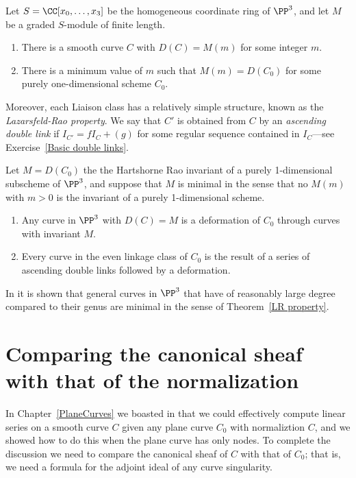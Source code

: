 \begin{fact}
\begin{theorem}
Let $S = \CC[x_0, \dots, x_3]$ be the homogeneous coordinate ring of $\PP^3$, and let $M$ be a graded $S$-module of finite length.
\begin{enumerate}
\item There is a smooth curve $C$ with $D(C) = M(m)$ for some integer $m$.
\item There is a minimum value of $m$ such that $M(m) = D(C_0)$ for some purely one-dimensional scheme $C_0$.
\end{enumerate}
\end{theorem}

Moreover, each Liaison class has a relatively simple structure, known as the \emph{Lazarsfeld-Rao property}.
We say that $C'$ is obtained from $C$ by an \emph{ascending double link} if $I_{C'} = fI_C+(g)$ for some regular sequence
contained in $I_C$---see Exercise~\ref{Basic double links}. 

\begin{theorem}\cite{MR1087803}\label{LR property}
Let $M = D(C_0)$ the the Hartshorne Rao invariant of a purely 1-dimensional subscheme of $\PP^3$, and suppose that
$M$ is minimal in the sense that no $M(m)$ with $m>0$ is the invariant of a purely 1-dimensional scheme. 
\begin{enumerate}
 \item Any curve in $\PP^3$ with $D(C) = M$ is a deformation of $C_{0}$ through curves with invariant $M$.
 \item Every curve in the even linkage class of $C_0$ is the result of a series of ascending double links followed by a deformation.
\end{enumerate}
\end{theorem}

In \cite{MR714753} it is shown that general curves  in $\PP^3$ that have 
of reasonably large degree compared to their genus are minimal in the sense 
of  Theorem~\ref{LR property}.
\end{fact}

\section{Comparing the canonical sheaf with that of the normalization}

In Chapter~\ref{PlaneCurves} we boasted in that we could effectively compute
linear series on a smooth curve $C$ given any plane curve $C_0$ with normaliztion $C$, 
and we showed how to do this when the plane curve has only nodes. To complete the discussion 
we need to compare the canonical sheaf of $C$ with
that of $C_0$; that is, we need a formula for the adjoint ideal of any curve singularity.



